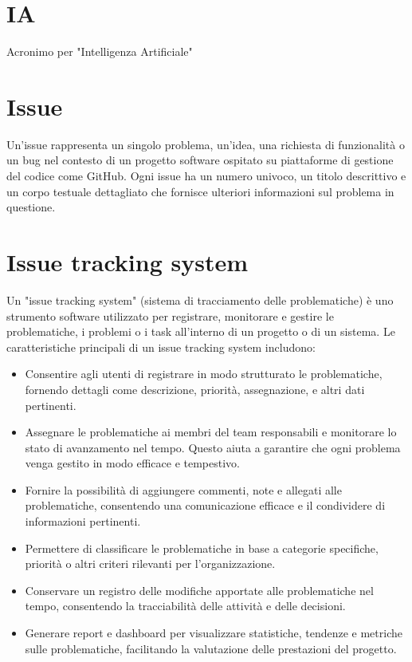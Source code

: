\documentclass{article}
\begin{document}
\section{IA}
Acronimo per "Intelligenza Artificiale"

\section{Issue}
Un'issue rappresenta un singolo problema, un'idea, una richiesta di funzionalità o un bug nel contesto di un progetto software ospitato su piattaforme di gestione del codice come GitHub. Ogni issue ha un numero univoco, un titolo descrittivo e un corpo testuale dettagliato che fornisce ulteriori informazioni sul problema in questione.

\section{Issue tracking system}
Un "issue tracking system" (sistema di tracciamento delle problematiche) è uno strumento software utilizzato per registrare, monitorare e gestire le problematiche, i problemi o i task all'interno di un progetto o di un sistema. Le caratteristiche principali di un issue tracking system includono:
\begin{itemize}
    \item Consentire agli utenti di registrare in modo strutturato le problematiche, fornendo dettagli come descrizione, priorità, assegnazione, e altri dati pertinenti.
    \item Assegnare le problematiche ai membri del team responsabili e monitorare lo stato di avanzamento nel tempo. Questo aiuta a garantire che ogni problema venga gestito in modo efficace e tempestivo.
    \item Fornire la possibilità di aggiungere commenti, note e allegati alle problematiche, consentendo una comunicazione efficace e il condividere di informazioni pertinenti.
    \item Permettere di classificare le problematiche in base a categorie specifiche, priorità o altri criteri rilevanti per l'organizzazione.
    \item Conservare un registro delle modifiche apportate alle problematiche nel tempo, consentendo la tracciabilità delle attività e delle decisioni.
    \item Generare report e dashboard per visualizzare statistiche, tendenze e metriche sulle problematiche, facilitando la valutazione delle prestazioni del progetto.
\end{itemize}
 
\end{document}
